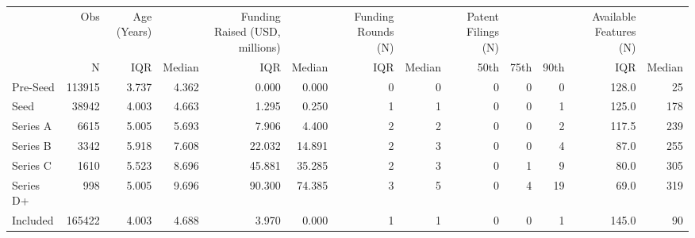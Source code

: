 \begin{tabular}{lrrrrrrrrrrrr}
\toprule
{} &     Obs & Age (Years) &        & Funding Raised (USD, millions) &         & Funding Rounds (N) &        & Patent Filings (N) &      &      & Available Features (N) &        \\
{} &       N &         IQR & Median &                            IQR &  Median &                IQR & Median &               50th & 75th & 90th &                    IQR & Median \\
\midrule
Pre-Seed  &  113915 &       3.737 &  4.362 &                          0.000 &   0.000 &                  0 &      0 &                  0 &    0 &    0 &                  128.0 &     25 \\
Seed      &   38942 &       4.003 &  4.663 &                          1.295 &   0.250 &                  1 &      1 &                  0 &    0 &    1 &                  125.0 &    178 \\
Series A  &    6615 &       5.005 &  5.693 &                          7.906 &   4.400 &                  2 &      2 &                  0 &    0 &    2 &                  117.5 &    239 \\
Series B  &    3342 &       5.918 &  7.608 &                         22.032 &  14.891 &                  2 &      3 &                  0 &    0 &    4 &                   87.0 &    255 \\
Series C  &    1610 &       5.523 &  8.696 &                         45.881 &  35.285 &                  2 &      3 &                  0 &    1 &    9 &                   80.0 &    305 \\
Series D+ &     998 &       5.005 &  9.696 &                         90.300 &  74.385 &                  3 &      5 &                  0 &    4 &   19 &                   69.0 &    319 \\
Included  &  165422 &       4.003 &  4.688 &                          3.970 &   0.000 &                  1 &      1 &                  0 &    0 &    1 &                  145.0 &     90 \\
\bottomrule
\end{tabular}
